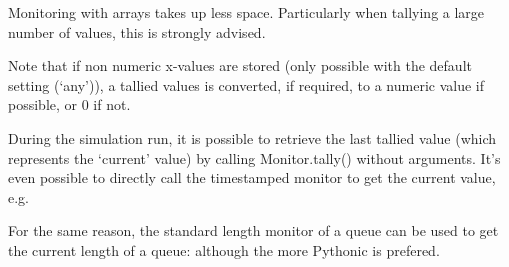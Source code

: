 \documentclass[letterpaper,10pt,english]{sphinxmanual}
\begin{document}
Monitoring with arrays takes up less space. Particularly when tallying a large
number of values, this is strongly advised.

Note that if non numeric x-values are stored (only possible with the default setting (‘any’)),
a tallied values is converted, if required, to a numeric value if possible, or 0 if not.

During the simulation run, it is possible to retrieve the last tallied value (which represents the ‘current’ value)
by calling Monitor.tally() without arguments. 
It’s even possible to directly call the timestamped monitor to get the current value, e.g.

\begin{sphinxVerbatim}[commandchars=\\\{\}]
  
   
\end{sphinxVerbatim}

For the same reason, the standard length monitor of a queue can be used to get the current length of a queue:  although
the more Pythonic  is prefered.
\end{document}

